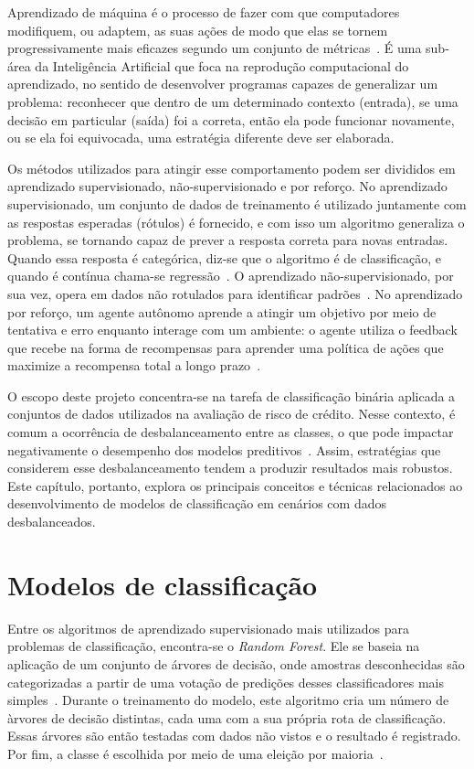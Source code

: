 Aprendizado de máquina é o processo de fazer com que computadores modifiquem, ou adaptem, as suas ações de modo que elas se tornem progressivamente mais eficazes segundo um conjunto de métricas~\cite{StephenMarsland2014}. É uma sub-área da Inteligência Artificial que foca na reprodução computacional do aprendizado, no sentido de desenvolver programas capazes de generalizar um problema: reconhecer que dentro de um determinado contexto (entrada), se uma decisão em particular (saída) foi a correta, então ela pode funcionar novamente, ou se ela foi equivocada, uma estratégia diferente deve ser elaborada.

Os métodos utilizados para atingir esse comportamento podem ser divididos em aprendizado supervisionado, não-supervisionado e por reforço. No aprendizado supervisionado, um conjunto de dados de treinamento é utilizado juntamente com as respostas esperadas (rótulos) é fornecido, e com isso um algoritmo generaliza o problema, se tornando capaz de prever a resposta correta para novas entradas. Quando essa resposta é categórica, diz-se que o algoritmo é de classificação, e quando é contínua chama-se regressão~\cite{SindhuMeena2020}. O aprendizado não-supervisionado, por sua vez, opera em dados não rotulados para identificar padrões~\cite{Dike2018}. No aprendizado por reforço, um agente autônomo aprende a atingir um objetivo por meio de tentativa e erro enquanto interage com um ambiente: o agente utiliza o feedback que recebe na forma de recompensas para aprender uma política de ações que maximize a recompensa total a longo prazo~\cite{Sutton2018}.

O escopo deste projeto concentra-se na tarefa de classificação binária aplicada a conjuntos de dados utilizados na avaliação de risco de crédito. Nesse contexto, é comum a ocorrência de desbalanceamento entre as classes, o que pode impactar negativamente o desempenho dos modelos preditivos~\cite{Namvar2018}. Assim, estratégias que considerem esse desbalanceamento tendem a produzir resultados mais robustos. Este capítulo, portanto, explora os principais conceitos e técnicas relacionados ao desenvolvimento de modelos de classificação em cenários com dados desbalanceados.

\section{Modelos de classificação}

Entre os algoritmos de aprendizado supervisionado mais utilizados para problemas de classificação, encontra-se o \textit{Random Forest}. Ele se baseia na aplicação de um conjunto de árvores de decisão, onde amostras desconhecidas são categorizadas a partir de uma votação de predições desses classificadores mais simples~\cite{Tang2021}. Durante o treinamento do modelo, este algoritmo cria um número de àrvores de decisão distintas, cada uma com a sua  própria rota de classificação. Essas árvores são então testadas com dados não vistos e o resultado é registrado. Por fim, a classe é escolhida por meio de uma eleição por maioria~\cite{Zhang2012}.


